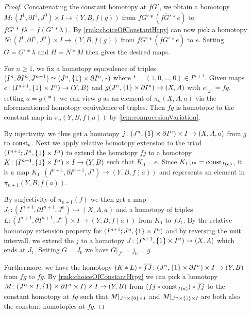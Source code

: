 \begin{prop}
\begin{proof}
        Concatenating the constant homotopy at $fG'$, we obtain a homotopy $M\colon(I^1,\partial I^1,J^0)\times I\to (Y,B,f(g))$ from $fG'*(\overline{fG'}*e)$ to $fG'*f\lambda=f(G'*\lambda)$.
        By \cref{rmk:choiceOfConstantHtpy} can now pick a homotopy $N\colon(I^1,\partial I^1,J^0)\times I\to(Y,B,f(g))$ from $fG'*(\overline{fG'}*e)$ to $e$. 
        Setting $G=G'*\lambda$ and $H=\overline{N}*M$ then gives the desired maps.

        For $n\geq 1$, we fix a homotopy equivalence of triples $(I^n,\partial I^n, J^{n-1})\simeq (J^n,\left\lbrace1\right\rbrace\times\partial I^n,*)$ where $*=(1,0,\ldots,0)\in I^{n+1}$.
        Given maps $e\colon(I^{n+1},\left\lbrace1\right\rbrace\times I^n)\to (Y,B)$ and $g(J^n,\left\lbrace1\right\rbrace\times\partial I^n)\to(X,A)$ with $e|_{J^n}=fg$, setting $a=g(*)$ we can view $g$ as an element of $\pi_n(X,A,a)$ via the aforementioned homotopy equivalence of triples.
        Then $fg$ is homotopic to the constant map in $\pi_n(Y,B,f(a))$ by \cref{lem:compressionVariation}.

        By injectivity, we thus get a homotopy $j\colon(J^n,\left\lbrace1\right\rbrace\times\partial I^n)\times I\to(X,A,a)$ from $g$ to $\operatorname{const}_a$.
        Next we apply relative homotopy extension to the triad $(I^{n+1};J^n,\left\lbrace1\right\rbrace\times I^n)$ to extend the homotopy $fj$ to a homotopy $K\colon(I^{n+1},\left\lbrace1\right\rbrace\times I^n)\times I\to(Y,B)$ such that $K_0=e$.
        Since $K_1|_{J^n}=\operatorname{const}_{f(a)}$, it is a map $K_1\colon(I^{n+1},\partial I^{n+1},J^n)\to(Y,B,f(a))$ and represents an element in $\pi_{n+1}(Y,B,f(a))$.
        
        By surjectivity of $\pi_{n+1}(f)$ we then get a map $J_1\colon(I^{n+1},\partial I^{n+1},J^n)\to(X,A,a)$ and a homotopy of triples $L\colon(I^{n+1},\partial I^{n+1},J^n)\times I\to(Y,B,f(a))$ from $K_1$ to $fJ_1$.
        By the relative homotopy extension property for $(I^{n+1};J^n,\left\lbrace1\right\rbrace\times I^n)$ and by reversing the unit intervall, we extend the $j$ to a homotopy $J\colon(I^{n+1},\left\lbrace1\right\rbrace\times I^n)\to(X,A)$ which ends at $J_1$.
        Setting $G=J_0$ we have $G|_{J^n}=j_0=g$.

        Furthermore, we have the homotopy $(K*L)*\overline{fJ}\colon(J^n,\left\lbrace1\right\rbrace\times\partial I^n)\times I\to(Y,B)$ from $fg$ to $fg$.
        By \cref{rmk:choiceOfConstantHtpy} we can pick a homotopy $M\colon(J^n\times I,\left\lbrace1\right\rbrace\times\partial I^n\times I)\times I\to(Y,B)$ from $(fj*\operatorname{const}_{f(a)})*\overline{fj}$ to the constant homotopy at $fg$ such that $M|_{J^n\times\left\lbrace0\right\rbrace\times I}$ and $M|_{J^n\times\left\lbrace1\right\rbrace\times I}$ are both also the constant homotopies at $fg$.
        

\end{proof}
\end{prop}
